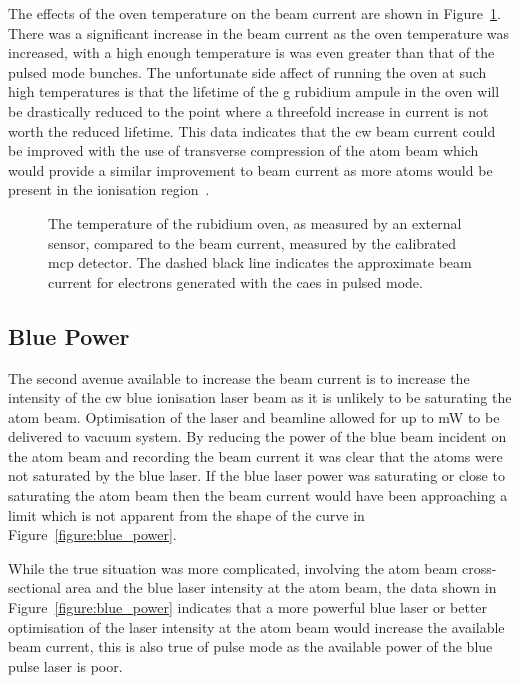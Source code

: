 The effects of the oven temperature on the beam current are shown in Figure~\ref{figure:oven_counts}.
There was a significant increase in the beam current as the oven temperature was increased, with a high enough temperature is was even greater than that of the pulsed mode bunches.
The unfortunate side affect of running the oven at such high temperatures is that the lifetime of the \unit[5]{g} rubidium ampule in the oven will be drastically reduced to the point where a threefold increase in current is not worth the reduced lifetime.
This data indicates that the \gls{cw} beam current could be improved with the use of transverse compression of the atom beam which would provide a similar improvement to beam current as more atoms would be present in the ionisation region~\cite{tielen_development_2015}.

\begin{figure}
    \center
    
    \caption[Beam current and rubidium oven temperature.]{The temperature of the rubidium oven, as measured by an external sensor, compared to the beam current, measured by the calibrated \gls{mcp} detector.
    The dashed black line indicates the approximate beam current for electrons generated with the \gls{caes} in pulsed mode.}
    \label{figure:oven_counts}
\end{figure}

\subsection{Blue Power}

The second avenue available to increase the beam current is to increase the intensity of the \gls{cw} blue ionisation laser beam as it is unlikely to be saturating the atom beam.
Optimisation of the laser and beamline allowed for up to \unit[280]{mW} to be delivered to vacuum system.
By reducing the power of the blue beam incident on the atom beam and recording the beam current it was clear that the atoms were not saturated by the blue laser.
If the blue laser power was saturating or close to saturating the atom beam then the beam current would have been approaching a limit which is not apparent from the shape of the curve in Figure~\ref{figure:blue_power}.

While the true situation was more complicated, involving the atom beam cross-sectional area and the blue laser intensity at the atom beam, the data shown in Figure~\ref{figure:blue_power} indicates that a more powerful blue laser or better optimisation of the laser intensity at the atom beam would increase the available beam current, this is also true of pulse mode as the available power of the blue pulse laser is poor.


